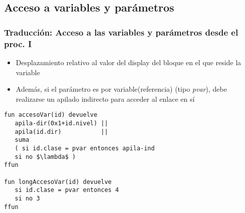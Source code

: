 \documentclass[hyperref={pdfpagelabels=false},tree-dvips,compress]{beamer}
\begin{document}
\subsection{Acceso a variables y parámetros}
\begin{frame}[fragile]
\frametitle{Traducción: Acceso a las variables y parámetros desde el proc. I}

\begin{itemize}
	\item Desplazamiento relativo al valor del display del bloque en el que reside la variable
	\item Además, si el parámetro es por variable(referencia) (tipo \emph{pvar}), debe realizarse un apilado indirecto para acceder al enlace en sí
\end{itemize}

\begin{lstlisting}[style=codigoMP,basicstyle=\footnotesize\ttfamily,mathescape]
fun accesoVar(id) devuelve
   apila-dir(0x1+id.nivel) ||
   apila(id.dir)           ||
   suma
   ( si id.clase = pvar entonces apila-ind
   si no $\lambda$ )
ffun

fun longAccesoVar(id) devuelve
   si id.clase = pvar entonces 4
   si no 3
ffun
\end{lstlisting}

\end{frame}
\end{document}
